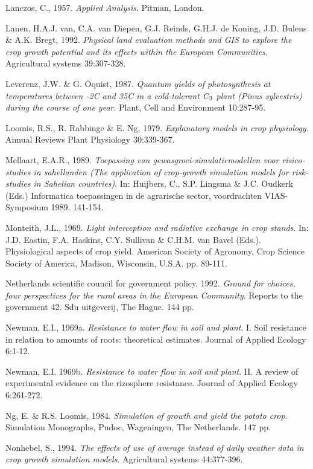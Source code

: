 Lanczos, C., 1957. {\it Applied Analysis\/}. Pitman, London.

Lanen, H.A.J. van, C.A. van Diepen, G.J. Reinds, G.H.J. de Koning, J.D. Bulens \& A.K. Bregt,
1992. {\it Physical land evaluation methods and GIS to explore the crop growth potential and its effects
within the European Commun\-ities\/}. Agricultural systems 39:307-328.

Leverenz, J.W. \& G. \"{O}quist, 1987. {\it Quantum yields of photosynthesis at temperatures between -2\degrees C
and 35\degrees C in a cold-tolerant C$_{{\rm 3}}$ plant (Pinus sylvestris) during the course of one year\/}. Plant, Cell and
Environment 10:287-95.

Loomis, R.S., R. Rabbinge \& E. Ng, 1979. {\it Explanatory models in crop physiology\/}. Annual Reviews
Plant Physiology 30:339-367.

Mellaart, E.A.R., 1989. {\it Toepassing van gewasgroei-{\nobreak}simulatiemodellen voor risico-studies in
sahellanden (The application of crop-growth simulation models for risk-studies in Sahelian countries)\/}.
In: Huijbers, C., S.P. Lingsma \& J.C. Oudkerk (Eds.) Informatica toepassingen in de agrarische
sector, voordrachten VIAS-Symposium 1989. 141-154.

Monteith, J.L., 1969. {\it Light interception and radiative exchange in crop stands\/}. In: J.D. Eastin, F.A.
Haskins, C.Y. Sullivan \& C.H.M. van Bavel (Eds.). Physiological aspects of crop yield. American
Society of Agronomy, Crop Science  Society of America, Madison, Wisconsin, U.S.A. pp. 89-111.

Netherlands scientific council for government policy, 1992. {\it Ground for choices, four perspectives
for the rural areas in the European Community\/}. Reports to the government 42. Sdu uitgeverij, The
Hague. 144 pp.

Newman, E.I., 1969a. {\it Resistance to water flow in soil and plant\/}. I. Soil resistance in relation to
amounts of roots: theoretical estimates. Journal of Applied Ecology 6:1-12.

Newman, E.I. 1969b. {\it Resistance to water flow in soil and plant\/}. II. A review of experimental
evidence on the rizosphere resistance. Journal of Applied Ecology 6:261-272.

Ng, E. \& R.S. Loomis, 1984. {\it Simulation of growth and yield the potato crop\/}. Simulation
Monographs, Pudoc, Wageningen, The Netherlands. 147 pp.

Nonhebel, S., 1994. {\it The effects of use of average instead of daily weather data in crop growth
simulation models\/}. Agricultural systems 44:377-396.

